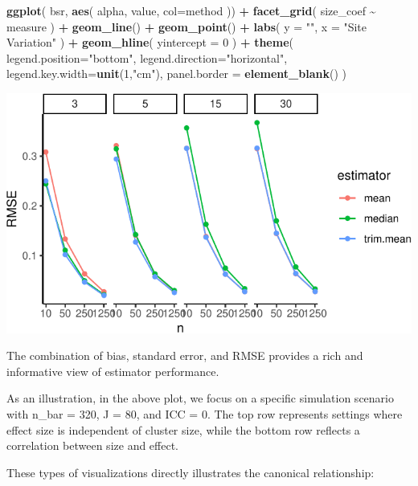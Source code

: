 \documentclass[
]{book}
\newenvironment{Shaded}{\begin{snugshade}}{\end{snugshade}}
\newcommand{\AttributeTok}[1]{\textcolor[rgb]{0.13,0.29,0.53}{#1}}
\newcommand{\DecValTok}[1]{\textcolor[rgb]{0.00,0.00,0.81}{#1}}
\newcommand{\FunctionTok}[1]{\textcolor[rgb]{0.13,0.29,0.53}{\textbf{#1}}}
\newcommand{\NormalTok}[1]{#1}
\newcommand{\SpecialCharTok}[1]{\textcolor[rgb]{0.81,0.36,0.00}{\textbf{#1}}}
\newcommand{\StringTok}[1]{\textcolor[rgb]{0.31,0.60,0.02}{#1}}
\begin{document}
\begin{Shaded}
\begin{Highlighting}[]
\FunctionTok{ggplot}\NormalTok{( bsr, }\FunctionTok{aes}\NormalTok{( alpha, value, }\AttributeTok{col=}\NormalTok{method )) }\SpecialCharTok{+}
  \FunctionTok{facet\_grid}\NormalTok{( size\_coef }\SpecialCharTok{\textasciitilde{}}\NormalTok{ measure ) }\SpecialCharTok{+}
  \FunctionTok{geom\_line}\NormalTok{() }\SpecialCharTok{+} \FunctionTok{geom\_point}\NormalTok{() }\SpecialCharTok{+}
  \FunctionTok{labs}\NormalTok{( }\AttributeTok{y =} \StringTok{""}\NormalTok{, }\AttributeTok{x =} \StringTok{"Site Variation"}\NormalTok{ )  }\SpecialCharTok{+}
  \FunctionTok{geom\_hline}\NormalTok{( }\AttributeTok{yintercept =} \DecValTok{0}\NormalTok{ ) }\SpecialCharTok{+}
  \FunctionTok{theme}\NormalTok{( }\AttributeTok{legend.position=}\StringTok{"bottom"}\NormalTok{,}
         \AttributeTok{legend.direction=}\StringTok{"horizontal"}\NormalTok{, }
         \AttributeTok{legend.key.width=}\FunctionTok{unit}\NormalTok{(}\DecValTok{1}\NormalTok{,}\StringTok{"cm"}\NormalTok{),}
         \AttributeTok{panel.border =} \FunctionTok{element\_blank}\NormalTok{() )}
\end{Highlighting}
\end{Shaded}

\begin{center}\includegraphics[width=0.75\linewidth]{Designing-Simulations-in-R_files/figure-latex/unnamed-chunk-184-1} \end{center}

The combination of bias, standard error, and RMSE provides a rich and informative view of estimator performance.

As an illustration, in the above plot, we focus on a specific simulation scenario with n\_bar = 320, J = 80, and ICC = 0. The top row represents settings where effect size is independent of cluster size, while the bottom row reflects a correlation between size and effect.

These types of visualizations directly illustrates the canonical relationship:
\end{document}

